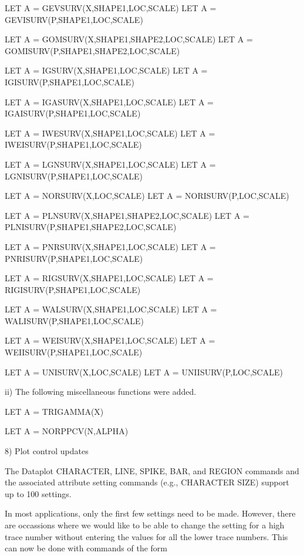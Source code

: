           LET A = GEVSURV(X,SHAPE1,LOC,SCALE)
          LET A = GEVISURV(P,SHAPE1,LOC,SCALE)

          LET A = GOMSURV(X,SHAPE1,SHAPE2,LOC,SCALE)
          LET A = GOMISURV(P,SHAPE1,SHAPE2,LOC,SCALE)

          LET A = IGSURV(X,SHAPE1,LOC,SCALE)
          LET A = IGISURV(P,SHAPE1,LOC,SCALE)

          LET A = IGASURV(X,SHAPE1,LOC,SCALE)
          LET A = IGAISURV(P,SHAPE1,LOC,SCALE)

          LET A = IWESURV(X,SHAPE1,LOC,SCALE)
          LET A = IWEISURV(P,SHAPE1,LOC,SCALE)

          LET A = LGNSURV(X,SHAPE1,LOC,SCALE)
          LET A = LGNISURV(P,SHAPE1,LOC,SCALE)

          LET A = NORSURV(X,LOC,SCALE)
          LET A = NORISURV(P,LOC,SCALE)

          LET A = PLNSURV(X,SHAPE1,SHAPE2,LOC,SCALE)
          LET A = PLNISURV(P,SHAPE1,SHAPE2,LOC,SCALE)

          LET A = PNRSURV(X,SHAPE1,LOC,SCALE)
          LET A = PNRISURV(P,SHAPE1,LOC,SCALE)

          LET A = RIGSURV(X,SHAPE1,LOC,SCALE)
          LET A = RIGISURV(P,SHAPE1,LOC,SCALE)

          LET A = WALSURV(X,SHAPE1,LOC,SCALE)
          LET A = WALISURV(P,SHAPE1,LOC,SCALE)

          LET A = WEISURV(X,SHAPE1,LOC,SCALE)
          LET A = WEIISURV(P,SHAPE1,LOC,SCALE)

          LET A = UNISURV(X,LOC,SCALE)
          LET A = UNIISURV(P,LOC,SCALE)

     ii) The following miscellaneous functions were added.

          LET A = TRIGAMMA(X)

          LET A = NORPPCV(N,ALPHA)

 8) Plot control updates

    The Dataplot CHARACTER, LINE, SPIKE, BAR, and REGION commands
    and the associated attribute setting commands (e.g., CHARACTER
    SIZE) support up to 100 settings.

    In most applications, only the first few settings need to be made.
    However, there are occassions where we would like to be able
    to change the setting for a high trace number without entering
    the values for all the lower trace numbers.  This can now be
    done with commands of the form

